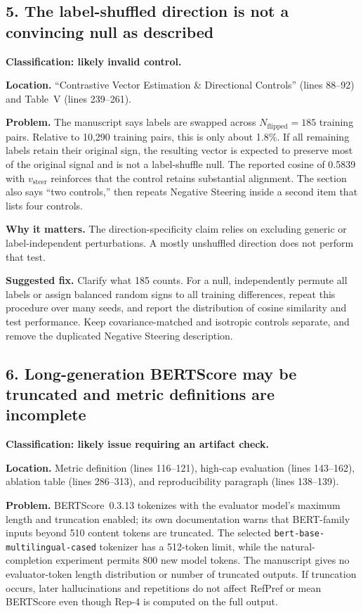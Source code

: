 \documentclass[11pt]{article}
\newcommand{\status}[1]{\textbf{#1}}
\begin{document}
\subsection*{5. The label-shuffled direction is not a convincing null as described}

\status{Classification: likely invalid control.}

\status{Location.} ``Contrastive Vector Estimation \& Directional Controls'' (lines 88--92) and Table~V (lines 239--261).

\status{Problem.} The manuscript says labels are swapped across $N_{\mathrm{flipped}}=185$ training pairs.  Relative to 10,290 training pairs, this is only about 1.8\%.  If all remaining labels retain their original sign, the resulting vector is expected to preserve most of the original signal and is not a label-shuffle null.  The reported cosine of 0.5839 with $v_{\text{steer}}$ reinforces that the control retains substantial alignment.  The section also says ``two controls,'' then repeats Negative Steering inside a second item that lists four controls.

\status{Why it matters.} The direction-specificity claim relies on excluding generic or label-independent perturbations.  A mostly unshuffled direction does not perform that test.

\status{Suggested fix.} Clarify what 185 counts.  For a null, independently permute all labels or assign balanced random signs to all training differences, repeat this procedure over many seeds, and report the distribution of cosine similarity and test performance.  Keep covariance-matched and isotropic controls separate, and remove the duplicated Negative Steering description.

\subsection*{6. Long-generation BERTScore may be truncated and metric definitions are incomplete}

\status{Classification: likely issue requiring an artifact check.}

\status{Location.} Metric definition (lines 116--121), high-cap evaluation (lines 143--162), ablation table (lines 286--313), and reproducibility paragraph (lines 138--139).

\status{Problem.} BERTScore~0.3.13 tokenizes with the evaluator model's maximum length and truncation enabled; its own documentation warns that BERT-family inputs beyond 510 content tokens are truncated.  The selected \texttt{bert-base-multilingual-cased} tokenizer has a 512-token limit, while the natural-completion experiment permits 800 new model tokens.  The manuscript gives no evaluator-token length distribution or number of truncated outputs.  If truncation occurs, later hallucinations and repetitions do not affect RefPref or mean BERTScore even though Rep-4 is computed on the full output.
\end{document}
